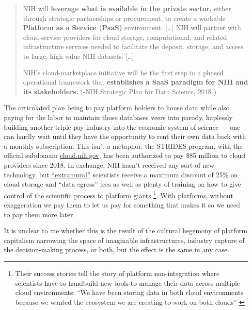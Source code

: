 \documentclass[10pt]{article}
\begin{document}
\begin{multicols}{2}
\begin{quote}
NIH will \textbf{leverage what is available in the private sector,}
either through strategic partnerships or procurement, to create a
workable \textbf{Platform as a Service (PaaS)} environment. {[}\ldots{]}
NIH will partner with cloud-service providers for cloud storage,
computational, and related infrastructure services needed to facilitate
the deposit, storage, and access to large, high-value NIH datasets.
{[}\ldots{]}

NIH's cloud-marketplace initiative will be the first step in a phased
operational framework that \textbf{establishes a SaaS paradigm for NIH
and its stakeholders.} (-NIH Strategic Plan for Data Science, 2018 \cite{NIHStrategicPlan2018} )
\end{quote}

The articulated plan being to pay platform holders to house data while
also paying for the labor to maintain those databases veers into parody,
haplessly building another triple-pay industry \cite{buranyiStaggeringlyProfitableBusiness2017}  into the economic system
of science --- one can hardly wait until they have the opportunity to
rent their own data back with a monthly subscription. This isn't a
metaphor: the STRIDES program, with the official subdomain
\href{https://web.archive.org/web/20210729131920/https://cloud.nih.gov/}{cloud.nih.gov},
has been authorized to pay \$85 million to cloud providers since 2018.
In exchange, NIH hasn't received any sort of new technology, but
\href{https://web.archive.org/web/20211006003547/https://cloud.nih.gov/enrollment/account-type/}{``extramural''}
scientists receive a maximum discount of 25\% on cloud storage and
``data egress'' fees as well as plenty of training on how to give
control of the scientific process to platform giants \cite{reillyNIHSTRIDESInitiative2021} \footnote{Their success stories tell
  the story of platform non-integration where scientists have to
  handbuild new tools to manage their data across multiple cloud
  environments: ``We have been storing data in both cloud environments
  because we wanted the ecosystem we are creating to work on both
  clouds'' \cite{STRIDESInitiativeSuccess2020} }. With platforms,
without exaggeration we pay them to let us pay for something that makes
it so we need to pay them more later.

It is unclear to me whether this is the result of the cultural hegemony
of platform capitalism narrowing the space of imaginable
infrastructures, industry capture of the decision-making process, or
both, but the effect is the same in any case.


\end{multicols}
\end{document}
